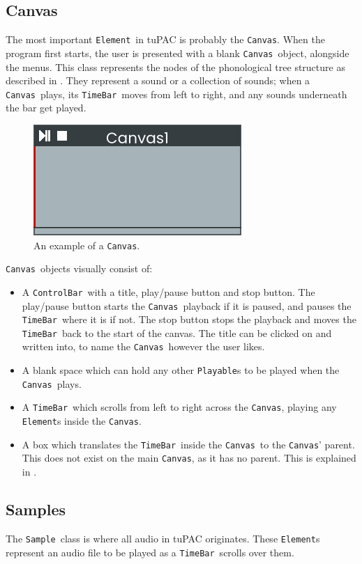 \documentclass[12pt,a4paper,oneside,openright]{report}
\newcommand{\element}{\texttt{Element}}
\newcommand{\canvas}{\texttt{Canvas}}
\newcommand{\controlbar}{\texttt{ControlBar}}
\newcommand{\timebar}{\texttt{TimeBar}}
\newcommand{\playable}{\texttt{Playable}}
\newcommand{\sample}{\texttt{Sample}}
\begin{document}
\subsection{Canvas}\label{sec:canvas}
The most important \element\ in tuPAC is probably the \canvas. When the program first starts, the user is presented with a blank \canvas\ object, alongside the menus. This class represents the nodes of the phonological tree structure as described in . They represent a sound or a collection of sounds; when a \canvas\ plays, its \timebar\ moves from left to right, and any sounds underneath the bar get played.

\begin{figure}[h]
    \centering
    \includegraphics{images/canvas.png}
    \caption{An example of a \canvas.}
    \label{fig:canvas}
\end{figure}

\canvas\ objects visually consist of:
\begin{itemize}
    \item A \controlbar\ with a title, play/pause button and stop button. The play/pause button starts the \canvas\ playback if it is paused, and pauses the \timebar\ where it is if not. The stop button stops the playback and moves the \timebar\ back to the start of the canvas. The title can be clicked on and written into, to name the \canvas\ however the user likes.
    \item A blank space which can hold any other \playable s to be played when the \canvas\ plays.
    \item A \timebar\ which scrolls from left to right across the \canvas, playing any \element s inside the \canvas.
    \item A box which translates the \timebar\ inside the \canvas\ to the \canvas' parent. This does not exist on the main \canvas, as it has no parent. This is explained in .
\end{itemize}

\subsection{Samples}
The \sample\ class is where all audio in tuPAC originates. These \element s represent an audio file to be played as a \timebar\ scrolls over them.
\end{document}
